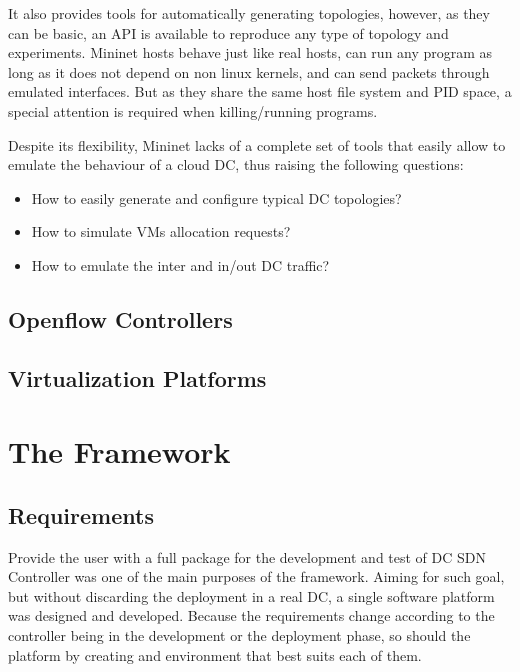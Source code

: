 \documentclass[12pt,english,oneside]{book}
\begin{document}
It also provides tools for automatically generating topologies, however, as they can be basic, an API is available to reproduce any type of topology and experiments.
Mininet hosts behave just like real hosts, can run any program as long as it does not depend on non linux kernels, and can send packets through emulated interfaces.
But as they share the same host file system and PID space, a special attention is required when killing/running programs.

Despite its flexibility, Mininet lacks of a complete set of tools that easily allow to emulate the behaviour of a cloud DC, thus raising the following questions:
 
\begin{itemize}
\item How to easily generate and configure typical DC topologies?
\item How to simulate VMs allocation requests?
\item How to emulate the inter and in/out DC traffic?
\end{itemize}

\newpage
\section{Openflow Controllers}
\hspace{0.6cm}


\newpage
\section{Virtualization Platforms}
\hspace{0.6cm}


\chapter{The Framework \label{cha:framework} }

\section{Requirements}
\hspace{0.6cm}

Provide the user with a full package for the development and test of DC SDN Controller was one of the main purposes of the framework.
Aiming for such goal, but without discarding the deployment in a real DC, a single software platform was designed and developed.
Because the requirements change according to the controller being in the development or the deployment phase, so should the platform by creating and environment that best suits each of them.
\end{document}
